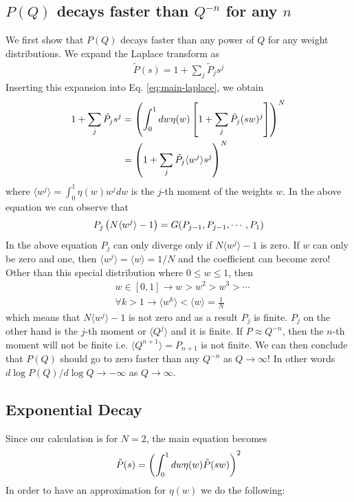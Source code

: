 \subsection*{$P(Q)$ decays faster than $Q^{-n}$ for any $n$}
We first show that $P(Q)$ decays faster than any power of $Q$ for any
weight distributions. We expand the Laplace transform as
%
\begin{align}
  \tilde P(s) = 1 + \sum_j \tilde P_{j} s^{j}
\end{align}
%
Inserting this expansion into Eq. \eqref{eq:main-laplace}, we obtain
%
\begin{align}
  1 + \sum_j \tilde P_{j} s^{j}  & = \left(  \int_0^1 d w \eta(w) \left[ 1 + \sum_j \tilde P_{j} (sw)^{j}\right]    \right)^{N} \\
 & = \left(  1 + \sum_j \tilde P_j \langle w^{j}\rangle  s^{j}   \right)^{N}
\end{align}
%
where $\langle w^j \rangle = \int_0^1 \eta(w) w^j dw$ is the $j$-th
moment of the weights $w$. In the above equation we can observe that
%
\begin{align}
  P_j \left( N \langle w^j\rangle -1 \right) = G(P_{j-1}, P_{j-1}, \cdots, P_1)
\end{align}
%
In the above equation $P_j$ can only diverge only if $N\langle w^j
\rangle -1$ is zero. If $w$ can only be zero and one, then $\langle
w^j\rangle =\langle w \rangle = 1/N$ and the coefficient can become
zero! Other than this special distribution where $0 \leq w \leq 1$,
then
%
\begin{align}
  & w\in [0,1] \rightarrow w>w^2>w^3> \cdots \\
  & \forall k>1 \rightarrow \langle w^k \rangle < \langle w \rangle = \frac{1}{N} 
\end{align}
%
which means that $N\langle w^j \rangle -1$ is not zero and as a result
$P_j$ is finite. $P_j$ on the other hand is the $j$-th moment or
$\langle Q^j\rangle$ and it is finite. If $P\approx Q^{-n}$, then the
$n$-th moment will not be finite i.e. $\langle Q^{n+1}\rangle =
P_{n+1}$ is not finite. We can then conclude that $P(Q)$ should go to
zero faster than any $Q^{-n}$ as $Q\to \infty$! In other words $d \log
P(Q) / d \log Q \to -\infty$ as $Q\to \infty$.  

\subsection*{Exponential Decay}
%
Since our calculation is for $N=2$, the main equation becomes
%
\begin{align}
  \tilde P(s) = \left(  \int_0^1 d w \eta(w) \tilde P(s w)  \right)^{2} 
\end{align}
%
In order to have an approximation for $\eta(w)$ we do the following:

